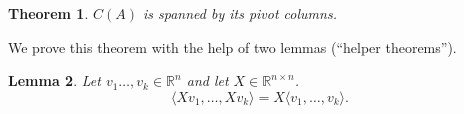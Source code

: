 \documentclass{amsart}
\newcommand{\RR}{\mathbb{R}}
\newtheorem{theorem}{Theorem}[section]
\newtheorem{lemma}[theorem]{Lemma}
\theoremstyle{definition}
\begin{document}
\begin{theorem}\label{theorem:pivot_cols_span_col_space}
$C(A)$ is spanned by its pivot columns.
\end{theorem}

We prove this theorem with the help of two lemmas (``helper theorems'').

\begin{lemma}
Let $v_1\ldots,v_k\in\RR^n$ and let $X\in\RR^{n\times n}$. 
  $$\langle X v_1,\ldots,X v_k\rangle = X\langle v_1,\ldots,v_k\rangle.$$
\end{lemma}
\end{document}
